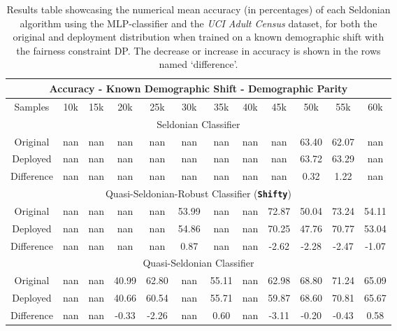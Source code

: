 \begin{table}[ht]
\footnotesize 
\centering
\begin{tabular}{|c|ccccccccccc|} \hline \multicolumn{12}{|c|}{Accuracy - Known Demographic Shift - Demographic Parity} \\ \hline \hline

Samples & 10k & 15k & 20k & 25k & 30k & 35k & 40k & 45k & 50k & 55k & 60k \\ \hline

\multicolumn{12}{|c|}{Seldonian Classifier} \\ \hline
Original & nan & nan & nan & nan & nan & nan & nan & nan & 63.40 & 62.07 & nan \\ \hline
Deployed & nan & nan & nan & nan & nan & nan & nan & nan & 63.72 & 63.29 & nan  \\ \hline 
Difference & nan & nan & nan & nan & nan & nan & nan & nan & 0.32 & 1.22 & nan  \\ \hline

\multicolumn{12}{|c|}{Quasi-Seldonian-Robust Classifier (\textbf{\texttt{Shifty}})} \\ \hline
Original & nan & nan & nan & nan & 53.99 & nan & nan & 72.87 & 50.04 & 73.24 & 54.11  \\ \hline
Deployed & nan & nan & nan & nan & 54.86 & nan & nan & 70.25 & 47.76 & 70.77 & 53.04  \\ \hline
Difference & nan & nan & nan & nan & 0.87 & nan & nan & -2.62 & -2.28 & -2.47 & -1.07  \\ \hline

\multicolumn{12}{|c|}{Quasi-Seldonian Classifier} \\ \hline
Original & nan & nan & 40.99 & 62.80 & nan & 55.11 & nan & 62.98 & 68.80 & 71.24 & 65.09 \\ \hline
Deployed & nan & nan & 40.66 & 60.54 & nan & 55.71 & nan & 59.87 & 68.60 & 70.81 & 65.67  \\ \hline
Difference & nan & nan & -0.33 & -2.26 & nan & 0.60 & nan & -3.11 & -0.20 & -0.43 & 0.58 \\ \hline
\end{tabular}
\caption{Results table showcasing the numerical mean accuracy (in percentages) of each Seldonian algorithm using the MLP-classifier and the \textit{UCI Adult Census} dataset, for both the original and deployment distribution when trained on a known demographic shift with the fairness constraint DP. The decrease or increase in accuracy is shown in the rows named `difference'.}
\label{tab:add_results}
\end{table}



